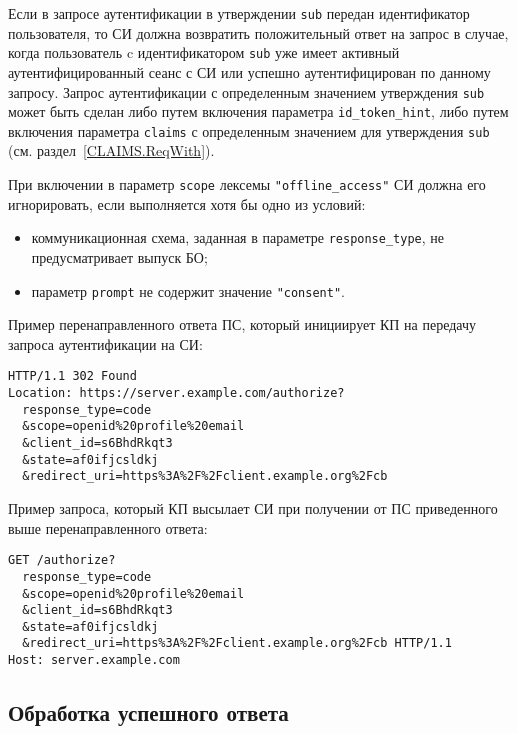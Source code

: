 Если в запросе аутентификации в утверждении \lstinline{sub} передан 
идентификатор пользователя, то СИ должна возвратить положительный ответ на 
запрос в случае, когда пользователь c идентификатором \lstinline{sub} 
уже имеет активный аутентифицированный сеанс с СИ или успешно аутентифицирован 
по данному запросу.
%
Запрос аутентификации с определенным значением утверждения \lstinline{sub} может
быть сделан либо путем включения параметра \lstinline{id_token_hint}, либо путем
включения параметра \lstinline{claims} с определенным значением для утверждения
\lstinline{sub} (см. раздел~\ref{CLAIMS.ReqWith}).


При включении в параметр \lstinline{scope} лексемы \lstinline{"offline_access"}
СИ должна его игнорировать, если выполняется хотя бы одно из условий:
\begin{itemize}
\item
коммуникационная схема, заданная в параметре \lstinline{response_type}, 
не предусматривает выпуск БО;
\item
параметр \lstinline{prompt} не содержит значение \lstinline{"consent"}.
\end{itemize}

Пример перенаправленного ответа ПС, который инициирует КП на передачу запроса 
аутентификации на СИ: 
%
\begin{lstlisting}
HTTP/1.1 302 Found
Location: https://server.example.com/authorize?
  response_type=code
  &scope=openid%20profile%20email
  &client_id=s6BhdRkqt3
  &state=af0ifjcsldkj
  &redirect_uri=https%3A%2F%2Fclient.example.org%2Fcb
\end{lstlisting}

Пример запроса, который КП высылает СИ при получении от ПС приведенного 
выше перенаправленного ответа:
%
\begin{lstlisting}
GET /authorize?
  response_type=code
  &scope=openid%20profile%20email
  &client_id=s6BhdRkqt3
  &state=af0ifjcsldkj
  &redirect_uri=https%3A%2F%2Fclient.example.org%2Fcb HTTP/1.1
Host: server.example.com
\end{lstlisting}

\subsection{Обработка успешного ответа}\label{REQRESP.Auth.Resp}

